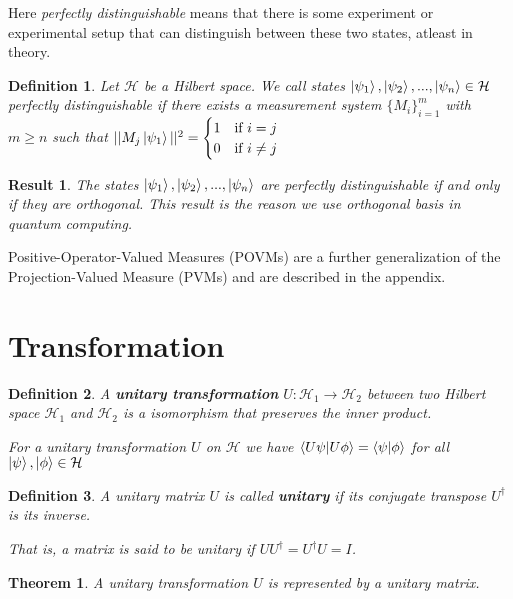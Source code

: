 \documentclass[12pt,twoside,fleqn]{report}
\makeatletter
\theoremstyle{thmstyle}
\renewenvironment{proof}[1][\proofname]{\par
\pushQED{\qed}%
\normalfont \topsep6\p@\@plus6\p@\relax
\trivlist
\item[\hskip\labelsep\itshape#1\@addpunct{.}]\mbox{}\par\nobreak\ignorespaces
}{%
    \popQED\endtrivlist\@endpefalse
    }
\newtheorem{defn}{Definition}[chapter]
\newtheorem{thm}{Theorem}[chapter]
\newtheorem{result}{Result}[chapter]
\makeatother
\begin{document}
Here \textit{perfectly distinguishable} means that there is some experiment or experimental setup that can distinguish between these two states, atleast in theory.

\begin{defn}
            Let $\mathcal{H}$ be a Hilbert space. We call states $\ket{\psi_1}, \ket{\psi_2}, ..., \ket{\psi_n} \in \mathcal{H}$ perfectly distinguishable if there exists a measurement system $\{ M_i \}_{i=1}^m$ with $m \geq n$ such that $|| M_j \ket{\psi_1} ||^2 = \begin{cases} 1 & \text{if } i = j \\ 0 & \text{if } i \neq j \end{cases}$
\end{defn}

\begin{result}
            The states $\ket{\psi_1}, \ket{\psi_2}, ..., \ket{\psi_n}$ are perfectly distinguishable if and only if they are orthogonal. This result is the reason we use orthogonal basis in quantum computing.
\end{result}

Positive-Operator-Valued Measures (POVMs) are a further generalization of the Projection-Valued Measure (PVMs) and are described in the appendix. 

\section{Transformation}

\begin{defn}
    A \textbf{unitary transformation} $U: \mathcal{H}_1 \to \mathcal{H}_2$ between two Hilbert space $\mathcal{H}_1$ and $\mathcal{H}_2$ is a isomorphism that preserves the inner product.

    For a unitary transformation $U$ on $\mathcal{H}$ we have
    $\braket{U \psi | U \phi } = \braket{\psi | \phi }$ for all $\ket{\psi}, \ket{\phi} \in \mathcal{H}$

\end{defn}

\begin{defn}
    A unitary matrix $U$ is called \textbf{unitary} if its conjugate transpose $U^\dagger$ is its inverse.

    That is, a matrix is said to be unitary if $U U^\dagger = U^\dagger U = I$.
\end{defn}

\begin{thm}
A unitary transformation $U$ is represented by a unitary matrix.
\end{thm}
\begin{proof}
\end{proof}
\end{document}
